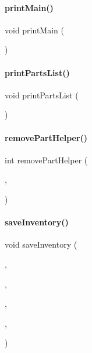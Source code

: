 \paragraph{\texorpdfstring{printMain()}{printMain()}}
{\footnotesize\ttfamily void print\+Main (\begin{DoxyParamCaption}{ }\end{DoxyParamCaption})}

\mbox{\label{main_8h_a54c74422af05849f9d508c0a5ccd468b}} 
\paragraph{\texorpdfstring{printPartsList()}{printPartsList()}}
{\footnotesize\ttfamily void print\+Parts\+List (\begin{DoxyParamCaption}\item[{\mbox{\hyperlink{class_inventory}{Inventory}} \&}]{ }\end{DoxyParamCaption})}

\mbox{\label{main_8h_a05031fafa43df25734364a97085b66be}} 
\paragraph{\texorpdfstring{removePartHelper()}{removePartHelper()}}
{\footnotesize\ttfamily int remove\+Part\+Helper (\begin{DoxyParamCaption}\item[{\mbox{\hyperlink{class_inventory}{Inventory}} \&}]{,  }\item[{\mbox{\hyperlink{main_8h_adbc27074b7dcd54cd4578936c6329d02}{enum\+Menu}} \&}]{ }\end{DoxyParamCaption})}

\mbox{\label{main_8h_a5e4e191ea94a60b35aab49d49b978f77}} 
\paragraph{\texorpdfstring{saveInventory()}{saveInventory()}}
{\footnotesize\ttfamily void save\+Inventory (\begin{DoxyParamCaption}\item[{std\+::fstream \&}]{,  }\item[{std\+::fstream \&}]{,  }\item[{\mbox{\hyperlink{class_inventory}{Inventory}} \&}]{,  }\item[{std\+::streampos \&}]{,  }\item[{const char $\ast$}]{ }\end{DoxyParamCaption})}

